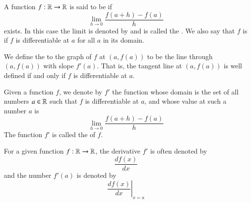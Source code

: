 \documentclass[12pt, a4paper, oneside, openright, titlepage]{book}
\begin{document}
\begin{defn}[Differentiability]
    A function $f:\mathbb R\rightarrow \mathbb R$ is said to be  if \begin{equation}
        \lim\limits_{h\rightarrow 0}\frac{f(a+h) - f(a)}{h}
    \end{equation}
    exists. In this case the limit is denoted by  and is called the . We also say that $f$ is  if $f$ is differentiable at $a$ for all $a$ in its domain.
\end{defn}

\begin{defn}
    We define the  to the graph of $f$ at $(a,f(a))$ to be the line through $(a,f(a))$ with slope $f'(a)$. That is, the tangent line at $(a,f(a))$ is well defined if and only if $f$ is differentiable at $a$.
\end{defn}


\begin{rmk}
    Given a function $f$, we denote by $f'$ the function whose domain is the set of all numbers $a \in \mathbb R$ such that $f$ is differentiable at $a$, and whose value at such a number $a$ is \begin{equation}
        \lim\limits_{h\rightarrow 0}\frac{f(a+h) - f(a)}{h}
    \end{equation}
    The function $f'$ is called the  of $f$.
\end{rmk}

\begin{nota}
    For a given function $f:\mathbb R\rightarrow \mathbb R$, the derivative $f'$ is often denoted by \begin{equation}
        \frac{df(x)}{dx}
    \end{equation}
    and the number $f'(a)$ is denoted by \begin{equation}
        \left.\frac{df(x)}{dx}\right\vert_{x=a}
    \end{equation}
\end{nota}
\end{document}
